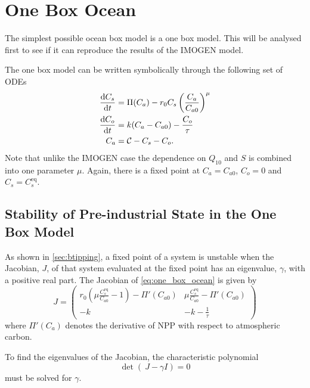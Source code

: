 \section{One Box Ocean}
The simplest possible ocean box model is a one box model. This will be analysed first to see if it can reproduce the results of the IMOGEN model.

The one box model can be written symbolically through the following set of ODEs
\begin{subequations}
  \label{eq:one_box_ocean}
  \begin{align}
    \dv{C_s}{t} &= \Pi(C_a) - r_0 C_s \left(\frac{C_a}{C_{a0}}\right)^{\mu} \\
    \dv{C_o}{t} &= k(C_a - C_{a0}) - \frac{C_o}{\tau} \\
    C_a &= \mathcal{C} - C_s - C_o.
\end{align}
\end{subequations}
Note that unlike the IMOGEN case the dependence on $Q_{10}$ and $S$ is combined into one parameter $\mu$. Again, there is a fixed point at
$C_a = C_{a0}$, $C_o = 0$ and $C_s = C_s^{\mathrm{eq}}$.

\subsection{Stability of Pre-industrial State in the One Box Model}
As shown in \cref{sec:btipping}, a fixed point of a system is unstable when the Jacobian, $J$, of that system evaluated at the fixed point has an eigenvalue, $\gamma$, with a positive real part.
The Jacobian of \cref{eq:one_box_ocean} is given by
\begin{equation}
  \label{eq:jacobian_of_one_box}
    J = 
    \begin{pmatrix}
    r_0 \left( \mu \frac{C_s^{\mathrm{eq}}}{C_{a0}} - 1\right) - \Pi'(C_{a0}) & 
    \mu \frac{C_s^{\mathrm{eq}}}{C_{a0}} - \Pi'(C_{a0}) \\
    -k & -k - \frac{1}{\tau}
    \end{pmatrix}
  \end{equation}
where $\Pi'(C_a)$ denotes the derivative of NPP with respect to atmospheric carbon.
  
To find the eigenvalues of the Jacobian, the characteristic polynomial
\begin{equation}
  \label{eq:char_poly}
  \det(\ J - \gamma I) = 0
\end{equation}
must be solved for $\gamma$.

